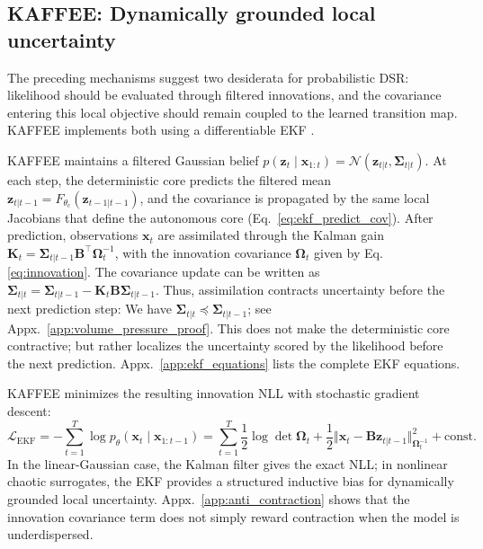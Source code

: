 \documentclass{article}
\theoremstyle{plain}
\theoremstyle{definition}
\theoremstyle{remark}
\begin{document}
\subsection{KAFFEE: Dynamically grounded local uncertainty}
\label{subsec:kaffee}
The preceding mechanisms suggest two desiderata for probabilistic DSR: likelihood should be evaluated through filtered innovations, and the covariance entering this local objective should remain coupled to the learned transition map. KAFFEE implements both using a differentiable EKF \citep{gupta1974computational, gorad2020parameter, sarkka2023bayesian, kokkala2016sigmapoint, haarnoja2016backprop,tanoh2026identifying}.

KAFFEE maintains a filtered Gaussian belief $p(\bm z_t\mid \bm x_{1:t}) = \mathcal N(\bm z_{t|t},\bm\Sigma_{t|t}).$ At each step, the deterministic core predicts the filtered mean $\bm z_{t|t-1} = F_{\theta_c}(\bm z_{t-1|t-1})$, and the covariance is propagated by the same local Jacobians that define the autonomous core (Eq.~\ref{eq:ekf_predict_cov}).
After prediction, observations $\bm x_t$ are assimilated through the Kalman gain $\bm K_t = \bm\Sigma_{t|t-1} \bm B^\top \bm\Omega_t^{-1}$, with the innovation covariance $\bm\Omega_t$ given by Eq. \ref{eq:innovation}. The covariance update can be written as
$\bm\Sigma_{t|t} = \bm\Sigma_{t|t-1} - \bm{K}_t\bm B\bm\Sigma_{t|t-1}$. 
Thus, assimilation contracts uncertainty before the next prediction step: We have $\bm\Sigma_{t|t}\preceq\bm\Sigma_{t|t-1}$; see Appx.~\ref{app:volume_pressure_proof}. This does not make the deterministic core contractive; but rather localizes the uncertainty scored by the likelihood before the next prediction. Appx.~\ref{app:ekf_equations} lists the complete EKF equations.

KAFFEE minimizes the resulting innovation NLL with stochastic gradient descent:
\begin{equation}
\label{eq:filtered_likelihood}
\mathcal L_{\mathrm{EKF}} = -\sum_{t=1}^T \log p_\theta(\bm x_t\mid \bm x_{1:t-1})=\sum_{t=1}^T \frac12\log\det\bm\Omega_t + \frac12\Vert\bm x_t-\bm B\bm z_{t|t-1}\Vert^2_{\bm\Omega_t^{-1}} + \mathrm{const.}
\end{equation}
In the linear-Gaussian case, the Kalman filter gives the exact NLL; in nonlinear chaotic surrogates, the EKF provides a structured inductive bias for dynamically grounded local uncertainty. Appx.~\ref{app:anti_contraction} shows that the innovation covariance term does not simply reward contraction when the model is underdispersed.
\end{document}
